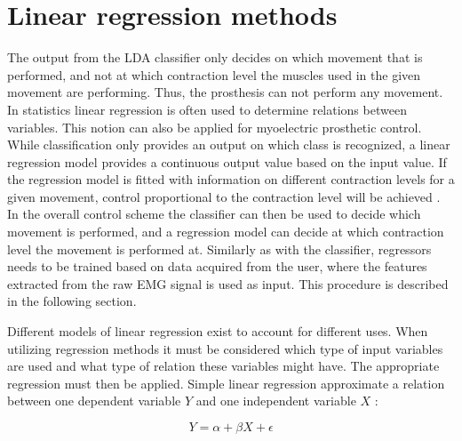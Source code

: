 \section{Linear regression methods}
The output from the LDA classifier only decides on which movement that is performed, and not at which contraction level the muscles used in the given movement are performing. Thus, the prosthesis can not perform any movement.  In statistics linear regression is often used to determine relations between variables. This notion can also be applied for myoelectric prosthetic control. While classification only provides an output on which class is recognized, a linear regression model provides a continuous output value based on the input value. If the regression model is fitted with information on different contraction levels for a given movement, control proportional to the contraction level will be achieved \cite{Hwang2017, Bruun2017, Hahne2014}. In the overall control scheme the classifier can then be used to decide which movement is performed, and a regression model can decide at which contraction level the movement is performed at. Similarly as with the classifier, regressors needs to be trained based on data acquired from the user, where the features extracted from the raw EMG signal is used as input. This procedure is described in the following section. 

Different models of linear regression exist to account for different uses. When utilizing regression methods it must be considered which type of input variables are used and what type of relation these variables might have. The appropriate regression must then be applied. Simple linear regression approximate a relation between one dependent variable $Y$ and one independent variable $X$ \cite{Zar2009}:

\begin{equation} \label{eq:simpleLinearRegression}
Y = \alpha + \beta X + \epsilon
\end{equation}


